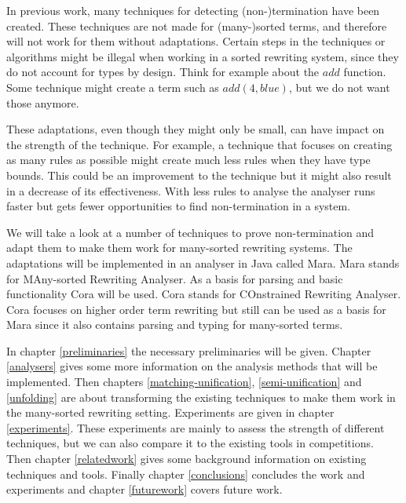 In previous work, many techniques for detecting (non-)termination have been created. These techniques are not made for (many-)sorted terms, and therefore will not work for them without adaptations. Certain steps in the techniques or algorithms might be illegal when working in a sorted rewriting system, since they do not account for types by design. Think for example about the $add$ function. Some technique might create a term such as $add(4, blue)$, but we do not want those anymore. 

These adaptations, even though they might only be small, can have impact on the strength of the technique. For example, a technique that focuses on creating as many rules as possible might create much less rules when they have type bounds. This could be an improvement to the technique but it might also result in a decrease of its effectiveness. With less rules to analyse the analyser runs faster but gets fewer opportunities to find non-termination in a system. 

We will take a look at a number of techniques to prove non-termination and adapt them to make them work for many-sorted rewriting systems. The adaptations will be implemented in an analyser in Java called Mara. Mara stands for MAny-sorted Rewriting Analyser. As a basis for parsing and basic functionality Cora will be used. Cora stands for COnstrained Rewriting Analyser. Cora focuses on higher order term rewriting but still can be used as a basis for Mara since it also contains parsing and typing for many-sorted terms. 

In chapter \ref{preliminaries} the necessary preliminaries will be given. Chapter \ref{analysers} gives some more information on the analysis methods that will be implemented. Then chapters \ref{matching-unification}, \ref{semi-unification} and \ref{unfolding} are about transforming the existing techniques to make them work in the many-sorted rewriting setting. Experiments are given in chapter \ref{experiments}. These experiments are mainly to  assess the strength of different techniques, but we can also compare it to the existing tools in competitions. Then chapter \ref{relatedwork} gives some background information on existing techniques and tools. Finally chapter \ref{conclusions} concludes the work and experiments and chapter \ref{futurework} covers future work. 